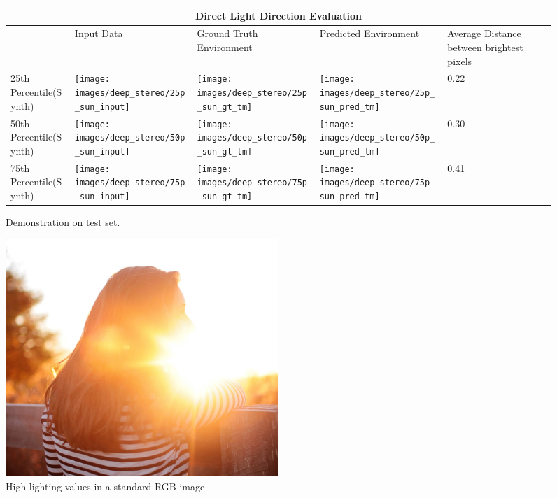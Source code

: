 \documentclass[ %
                    author={Gavin Parker},
                supervisor={Dr. Neill Campbell},
                    degree={MEng},
                     title={Deep Siamese Networks for Illumination Estimation from Stereo Images},
                  subtitle={},
                      type={research},
                      year={2018} ]{dissertation}
\begin{document}
\begin{figure}[H]
\centering
\begin{tabular}{ |p{3cm}||p{3cm}|p{3cm}|p{3cm}|p{3cm}|  }
 \hline
 \multicolumn{5}{|c|}{Direct Light Direction Evaluation} \\
 \hline
  & Input Data &Ground Truth Environment&Predicted Environment&Average Distance between brightest pixels\\
 \hline
 25th Percentile(Synth)&\parbox[c]{1em}{
 \texttt{[image: images/deep\_stereo/25p\_sun\_input]}}&\parbox[c]{1em}{\texttt{[image: images/deep\_stereo/25p\_sun\_gt\_tm]}}&
\parbox[c]{1em}{\texttt{[image: images/deep\_stereo/25p\_sun\_pred\_tm]}}& 0.22\\
 50th Percentile(Synth)&\parbox[c]{1em}{
 \texttt{[image: images/deep\_stereo/50p\_sun\_input]}}&\parbox[c]{1em}{\texttt{[image: images/deep\_stereo/50p\_sun\_gt\_tm]}}&
\parbox[c]{1em}{\texttt{[image: images/deep\_stereo/50p\_sun\_pred\_tm]}}& 0.30\\
 75th Percentile(Synth)&\parbox[c]{1em}{
 \texttt{[image: images/deep\_stereo/75p\_sun\_input]}}&\parbox[c]{1em}{\texttt{[image: images/deep\_stereo/75p\_sun\_gt\_tm]}}&
\parbox[c]{1em}{\texttt{[image: images/deep\_stereo/75p\_sun\_pred\_tm]}}& 0.41\\
 \hline
\end{tabular}

\label{mse_results}
\caption{Demonstration on test set.}

\end{figure}
\begin{figure}[h]
\centering
\includegraphics[width=0.5\textwidth]{exposure_example}
\caption{High lighting values in a standard RGB image}
\label{rgb_example}
\end{figure}
\end{document}
